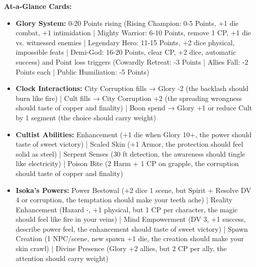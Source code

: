 \documentclass[11pt]{article}
\begin{document}
\textbf{At-a-Glance Cards:}
\begin{itemize}
\item \textbf{Glory System:} 0-20 Points rising (Rising Champion: 0-5 Points, +1 die combat, +1 intimidation | Mighty Warrior: 6-10 Points, remove 1 CP, +1 die vs. witnessed enemies | Legendary Hero: 11-15 Points, +2 dice physical, impossible feats | Demi-God: 16-20 Points, clear CP, +2 dice, automatic success) and Point loss triggers (Cowardly Retreat: -3 Points | Allies Fall: -2 Points each | Public Humiliation: -5 Points)
\item \textbf{Clock Interactions:} City Corruption fills → Glory -2 (the backlash should burn like fire) | Cult fills → City Corruption +2 (the spreading wrongness should taste of copper and finality) | Boon spend → Glory +1 or reduce Cult by 1 segment (the choice should carry weight)
\item \textbf{Cultist Abilities:} Enhancement (+1 die when Glory 10+, the power should taste of sweet victory) | Scaled Skin (+1 Armor, the protection should feel solid as steel) | Serpent Senses (30 ft detection, the awareness should tingle like electricity) | Poison Bite (2 Harm + 1 CP on grapple, the corruption should taste of copper and finality)
\item \textbf{Isoka's Powers:} Power Bestowal (+2 dice 1 scene, but Spirit + Resolve DV 4 or corruption, the temptation should make your teeth ache) | Reality Enhancement (Hazard -, +1 physical, but 1 CP per character, the magic should feel like fire in your veins) | Mind Empowerment (DV 3, +1 success, describe power feel, the enhancement should taste of sweet victory) | Spawn Creation (1 NPC/scene, new spawn +1 die, the creation should make your skin crawl) | Divine Presence (Glory +2 allies, but 2 CP per ally, the attention should carry weight)
\end{itemize}
\end{document}
